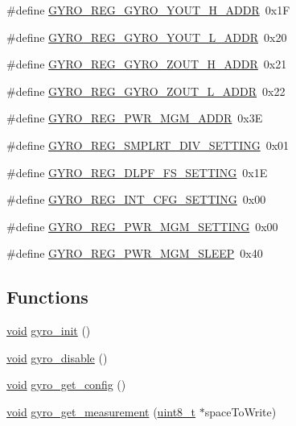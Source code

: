 \begin{DoxyCompactItemize}
\item 
\#define \hyperlink{group___gyro_gaa4842b7cc75e2a69b930b158363be841}{G\+Y\+R\+O\+\_\+\+R\+E\+G\+\_\+\+G\+Y\+R\+O\+\_\+\+Y\+O\+U\+T\+\_\+\+H\+\_\+\+A\+D\+DR}~0x1F
\item 
\#define \hyperlink{group___gyro_ga4c7253efb1e06b19171bf73d4ba255d6}{G\+Y\+R\+O\+\_\+\+R\+E\+G\+\_\+\+G\+Y\+R\+O\+\_\+\+Y\+O\+U\+T\+\_\+\+L\+\_\+\+A\+D\+DR}~0x20
\item 
\#define \hyperlink{group___gyro_gab41f7d5bb2d6ff24ea5fc5072e5e0cd6}{G\+Y\+R\+O\+\_\+\+R\+E\+G\+\_\+\+G\+Y\+R\+O\+\_\+\+Z\+O\+U\+T\+\_\+\+H\+\_\+\+A\+D\+DR}~0x21
\item 
\#define \hyperlink{group___gyro_gab8e92412676e8733bad045671a91a897}{G\+Y\+R\+O\+\_\+\+R\+E\+G\+\_\+\+G\+Y\+R\+O\+\_\+\+Z\+O\+U\+T\+\_\+\+L\+\_\+\+A\+D\+DR}~0x22
\item 
\#define \hyperlink{group___gyro_gac4d83a6d80d9efa12f92f3f0efba71f8}{G\+Y\+R\+O\+\_\+\+R\+E\+G\+\_\+\+P\+W\+R\+\_\+\+M\+G\+M\+\_\+\+A\+D\+DR}~0x3E
\item 
\#define \hyperlink{group___gyro_gafb787d9389038e80428787576ec03b64}{G\+Y\+R\+O\+\_\+\+R\+E\+G\+\_\+\+S\+M\+P\+L\+R\+T\+\_\+\+D\+I\+V\+\_\+\+S\+E\+T\+T\+I\+NG}~0x01
\item 
\#define \hyperlink{group___gyro_ga912da8a3df05ccb9099d12ac4c4f4ee6}{G\+Y\+R\+O\+\_\+\+R\+E\+G\+\_\+\+D\+L\+P\+F\+\_\+\+F\+S\+\_\+\+S\+E\+T\+T\+I\+NG}~0x1E
\item 
\#define \hyperlink{group___gyro_gafe867214cf7297c80c6550765089c7ec}{G\+Y\+R\+O\+\_\+\+R\+E\+G\+\_\+\+I\+N\+T\+\_\+\+C\+F\+G\+\_\+\+S\+E\+T\+T\+I\+NG}~0x00
\item 
\#define \hyperlink{group___gyro_ga4e924aa45d0e85915c2a95e25da1efee}{G\+Y\+R\+O\+\_\+\+R\+E\+G\+\_\+\+P\+W\+R\+\_\+\+M\+G\+M\+\_\+\+S\+E\+T\+T\+I\+NG}~0x00
\item 
\#define \hyperlink{group___gyro_gafea8d06f89f5a253ecb20a6fc44d374d}{G\+Y\+R\+O\+\_\+\+R\+E\+G\+\_\+\+P\+W\+R\+\_\+\+M\+G\+M\+\_\+\+S\+L\+E\+EP}~0x40
\end{DoxyCompactItemize}
\subsection*{Functions}
\begin{DoxyCompactItemize}
\item 
\hyperlink{usb__devapi_8h_afabf60e7f57651d6d595a02c75f07cd0}{void} \hyperlink{group___gyro_ga5957d23b502103ace4785c3a130185a3}{gyro\+\_\+init} ()
\item 
\hyperlink{usb__devapi_8h_afabf60e7f57651d6d595a02c75f07cd0}{void} \hyperlink{group___gyro_ga989834a2a9fcca553f00e89abc83130d}{gyro\+\_\+disable} ()
\item 
\hyperlink{usb__devapi_8h_afabf60e7f57651d6d595a02c75f07cd0}{void} \hyperlink{group___gyro_gabc6dc648545d5a60a10da18757518c14}{gyro\+\_\+get\+\_\+config} ()
\item 
\hyperlink{usb__devapi_8h_afabf60e7f57651d6d595a02c75f07cd0}{void} \hyperlink{group___gyro_gac06c6ed39476dab7cf87a580cf22ce64}{gyro\+\_\+get\+\_\+measurement} (\hyperlink{_p_e___types_8h_aba7bc1797add20fe3efdf37ced1182c5}{uint8\+\_\+t} $\ast$space\+To\+Write)
\end{DoxyCompactItemize}



